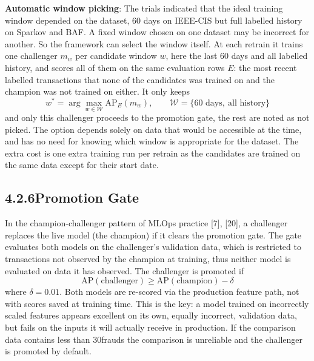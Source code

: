 \documentclass[11pt,letterpaper]{report}
\begin{document}
\textbf{Automatic window picking}: The trials indicated that the ideal training window depended on the dataset, 60 days on IEEE-CIS but full labelled history on Sparkov and BAF. A fixed window chosen on one dataset may be incorrect for another. So the framework can select the window itself. At each retrain it trains one challenger $m_w$ per candidate window $w$, here the last 60 days and all labelled history, and scores all of them on the same evaluation rows $E$: the most recent labelled transactions that none of the candidates was trained on and the champion was not trained on either. It only keeps
\begin{equation*}
  w^{*} = \arg\max_{w \in \mathcal{W}} \mathrm{AP}_{E}(m_w), \qquad \mathcal{W} = \{\text{60 days},\ \text{all history}\} \tag{4.8}
\end{equation*}
and only this challenger proceeds to the promotion gate, the rest are noted as not picked. The option depends solely on data that would be accessible at the time, and has no need for knowing which window is appropriate for the dataset. The extra cost is one extra training run per retrain as the candidates are trained on the same data except for their start date.

\subsection*{4.2.6\quad Promotion Gate}

In the champion-challenger pattern of MLOps practice [7], [20], a challenger replaces the live model (the champion) if it clears the promotion gate. The gate evaluates both models on the challenger's validation data, which is restricted to transactions not observed by the champion at training, thus neither model is evaluated on data it has observed. The challenger is promoted if
\begin{equation*}
  \mathrm{AP}(\text{challenger}) \ge \mathrm{AP}(\text{champion}) - \delta \tag{4.9}
\end{equation*}
where $\delta = 0.01$. Both models are re-scored via the production feature path, not with scores saved at training time. This is the key: a model trained on incorrectly scaled features appears excellent on its own, equally incorrect, validation data, but fails on the inputs it will actually receive in production. If the comparison data contains less than 30frauds the comparison is unreliable and the challenger is promoted by default.
\end{document}
